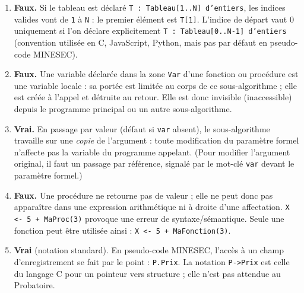 \documentclass[11pt]{article}
\newcommand{\cle}[1]{{\popxbold\color{popdark}#1}}
\begin{document}
\begin{corrige}
\begin{enumerate}
    \item \textbf{Faux.} Si le tableau est déclaré \texttt{T : Tableau[1..N] d'entiers}, les indices valides vont de \texttt{1} à \texttt{N} : le premier élément est \texttt{T[1]}. L'indice de départ vaut 0 uniquement si l'on déclare explicitement \texttt{T : Tableau[0..N-1] d'entiers} (convention utilisée en C, JavaScript, Python, mais pas par défaut en pseudo-code MINESEC).
    \item \textbf{Faux.} Une variable déclarée dans la zone \texttt{Var} d'une fonction ou procédure est une variable \cle{locale} : sa portée est limitée au corps de ce sous-algorithme ; elle est créée à l'appel et détruite au retour. Elle est donc invisible (inaccessible) depuis le programme principal ou un autre sous-algorithme.
    \item \textbf{Vrai.} En passage \cle{par valeur} (défaut si \texttt{var} absent), le sous-algorithme travaille sur une \emph{copie} de l'argument : toute modification du paramètre formel n'affecte pas la variable du programme appelant. (Pour modifier l'argument original, il faut un passage par référence, signalé par le mot-clé \texttt{var} devant le paramètre formel.)
    \item \textbf{Faux.} Une procédure ne retourne pas de valeur ; elle ne peut donc pas apparaître dans une expression arithmétique ni à droite d'une affectation. \texttt{X <- 5 + MaProc(3)} provoque une erreur de syntaxe/sémantique. Seule une fonction peut être utilisée ainsi : \texttt{X <- 5 + MaFonction(3)}.
    \item \textbf{Vrai} (notation standard). En pseudo-code MINESEC, l'accès à un champ d'enregistrement se fait par le point : \texttt{P.Prix}. La notation \texttt{P->Prix} est celle du langage C pour un pointeur vers structure ; elle n'est pas attendue au Probatoire.
\end{enumerate}
\end{corrige}
\end{document}
